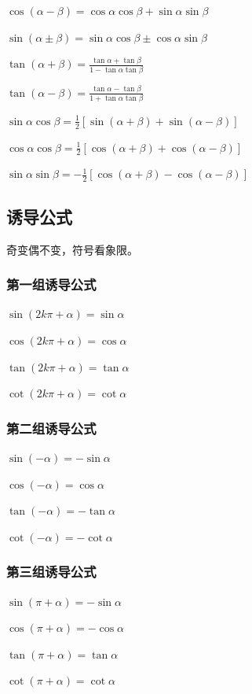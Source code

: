 \documentclass[UTF8]{ctexbook}
\begin{document}
{{{  $\cos(\alpha - \beta) = \cos{\alpha}\cos{\beta} + \sin{\alpha}\sin{\beta}$

  $\sin(\alpha \pm \beta) = \sin{\alpha}\cos{\beta} \pm \cos{\alpha}\sin{\beta}$

  $\tan(\alpha + \beta) = \frac{\tan\alpha + \tan\beta}{1 - \tan\alpha\tan\beta}$

  $\tan(\alpha - \beta) = \frac{\tan\alpha - \tan\beta}{1 + \tan\alpha\tan\beta}$

  $\sin{\alpha}\cos{\beta} = \frac{1}{2}[\sin{(\alpha + \beta)} + \sin{(\alpha - \beta)}]$

  $\cos{\alpha}\cos{\beta} = \frac{1}{2}[\cos{(\alpha + \beta)} + \cos{(\alpha - \beta)}]$

  $\sin{\alpha}\sin{\beta} = -\frac{1}{2}[\cos{(\alpha + \beta)} - \cos{(\alpha - \beta)}]$
}

\subsection{诱导公式}{
  \indent 奇变偶不变，符号看象限。
  \subsubsection{第一组诱导公式}{
    $\sin{(2k\pi + \alpha)} = \sin{\alpha}$

    $\cos{(2k\pi + \alpha)} = \cos{\alpha}$

    $\tan(2k\pi + \alpha) = \tan\alpha$

    $\cot(2k\pi + \alpha) = \cot\alpha$
  }

  \subsubsection{第二组诱导公式}{
    $\sin(-\alpha) = -\sin\alpha$

    $\cos(-\alpha) = \cos\alpha$

    $\tan(-\alpha) = -\tan\alpha$

    $\cot(-\alpha) = -\cot\alpha$
  }

  \subsubsection{第三组诱导公式}{
    $\sin(\pi + \alpha) = -\sin\alpha$

    $\cos(\pi + \alpha) = -\cos\alpha$

    $\tan(\pi + \alpha) = \tan\alpha$

    $\cot(\pi + \alpha) = \cot\alpha$
  }

}}}
\end{document}
